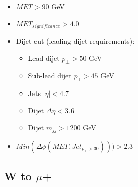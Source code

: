 \begin{itemize}
\begin{itemize}
  \end{itemize}
  \item $ MET > 90 $ GeV
  \item $ MET_{significance} > 4.0 $
  \item Dijet cut (leading dijet requirements):
  \begin{itemize}
    \item Lead dijet $ p_{\perp} > 50$ GeV
    \item Sub-lead dijet $ p_{\perp} > 45$ GeV
    \item Jets $ |\eta| < 4.7 $
    \item Dijet $ \Delta\eta < 3.6 $
    \item Dijet $ m_{jj} > 1200 $ GeV
  \end{itemize}
  \item $ Min(\Delta\phi(MET,Jet_{p_{\perp}>30})))>2.3 $
\end{itemize}




\subsection{W to \texorpdfstring{$\mu$+\MET}{muon+MET}}


